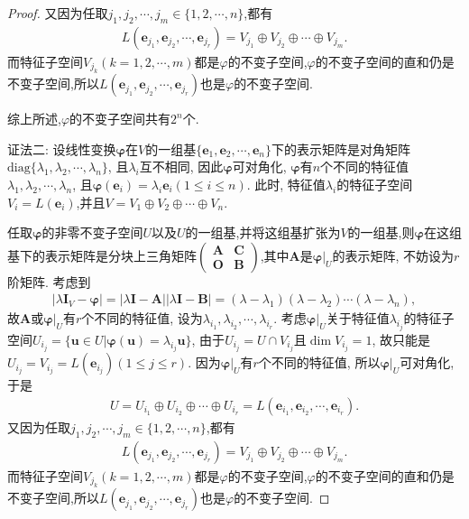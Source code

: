\documentclass[../../main.tex]{subfiles}%
\begin{document}
\begin{proof}
又因为任取$j_1,j_2,\cdots,j_m\in\{1,2,\cdots,n\}$,都有
\begin{align*}
L(\boldsymbol{e}_{j_1},\boldsymbol{e}_{j_2},\cdots ,\boldsymbol{e}_{j_r})=V_{j_1}\oplus V_{j_2}\oplus \cdots \oplus V_{j_m}.
\end{align*}
而特征子空间$V_{j_k}(k=1,2,\cdots,m)$都是\(\varphi\)的不变子空间,\(\varphi\)的不变子空间的直和仍是不变子空间,所以$L(\boldsymbol{e}_{j_1},\boldsymbol{e}_{j_2},\cdots ,\boldsymbol{e}_{j_r})$也是\(\varphi\)的不变子空间.

综上所述,\(\varphi\)的不变子空间共有\(2^n\)个.

{\color{blue}证法二:}
设线性变换\(\boldsymbol{\varphi}\)在\(V\)的一组基\(\{\boldsymbol{e}_1,\boldsymbol{e}_2,\cdots,\boldsymbol{e}_n\}\)下的表示矩阵是对角矩阵\(\mathrm{diag}\{\lambda_1,\lambda_2,\cdots,\lambda_n\}\), 且\(\lambda_i\)互不相同, 因此\(\boldsymbol{\varphi}\)可对角化, \(\boldsymbol{\varphi}\)有\(n\)个不同的特征值\(\lambda_1,\lambda_2,\cdots,\lambda_n\), 且\(\boldsymbol{\varphi}(\boldsymbol{e}_i) = \lambda_i\boldsymbol{e}_i(1\leqslant  i\leqslant  n)\). 此时, 特征值\(\lambda_i\)的特征子空间\(V_i = L(\boldsymbol{e}_i)\),并且\(V = V_1\oplus V_2\oplus\cdots\oplus V_n\). 

任取\(\boldsymbol{\varphi}\)的非零不变子空间\(U\)以及\(U\)的一组基,并将这组基扩张为\(V\)的一组基,则\(\boldsymbol{\varphi}\)在这组基下的表示矩阵是分块上三角矩阵\(\begin{pmatrix}
\boldsymbol{A}&\boldsymbol{C}\\
\boldsymbol{O}&\boldsymbol{B}
\end{pmatrix}\),其中\(\boldsymbol{A}\)是\(\boldsymbol{\varphi}|_U\)的表示矩阵, 不妨设为\(r\)阶矩阵. 考虑到
\begin{align*}
|\lambda\boldsymbol{I}_V - \boldsymbol{\varphi}| = |\lambda\boldsymbol{I} - \boldsymbol{A}||\lambda\boldsymbol{I} - \boldsymbol{B}| = (\lambda - \lambda_1)(\lambda - \lambda_2)\cdots(\lambda - \lambda_n),
\end{align*}
故\(\boldsymbol{A}\)或\(\boldsymbol{\varphi}|_U\)有\(r\)个不同的特征值, 设为\(\lambda_{i_1},\lambda_{i_2},\cdots,\lambda_{i_r}\). 考虑\(\boldsymbol{\varphi}|_U\)关于特征值\(\lambda_{i_j}\)的特征子空间\(U_{i_j} = \{\boldsymbol{u}\in U|\boldsymbol{\varphi}(\boldsymbol{u}) = \lambda_{i_j}\boldsymbol{u}\}\), 由于\(U_{i_j} = U\cap V_{i_j}\)且\(\dim V_{i_j} = 1\), 故只能是\(U_{i_j} = V_{i_j} = L(\boldsymbol{e}_{i_j})(1\leqslant  j\leqslant  r)\). 因为\(\boldsymbol{\varphi}|_U\)有\(r\)个不同的特征值, 所以\(\boldsymbol{\varphi}|_U\)可对角化, 于是
\begin{align*}
U = U_{i_1}\oplus U_{i_2}\oplus\cdots\oplus U_{i_r} = L(\boldsymbol{e}_{i_1},\boldsymbol{e}_{i_2},\cdots,\boldsymbol{e}_{i_r}).
\end{align*}
又因为任取$j_1,j_2,\cdots,j_m\in\{1,2,\cdots,n\}$,都有
\begin{align*}
L(\boldsymbol{e}_{j_1},\boldsymbol{e}_{j_2},\cdots ,\boldsymbol{e}_{j_r})=V_{j_1}\oplus V_{j_2}\oplus \cdots \oplus V_{j_m}.
\end{align*}
而特征子空间$V_{j_k}(k=1,2,\cdots,m)$都是\(\varphi\)的不变子空间,\(\varphi\)的不变子空间的直和仍是不变子空间,所以$L(\boldsymbol{e}_{j_1},\boldsymbol{e}_{j_2},\cdots ,\boldsymbol{e}_{j_r})$也是\(\varphi\)的不变子空间.


\end{proof}
\end{document}
